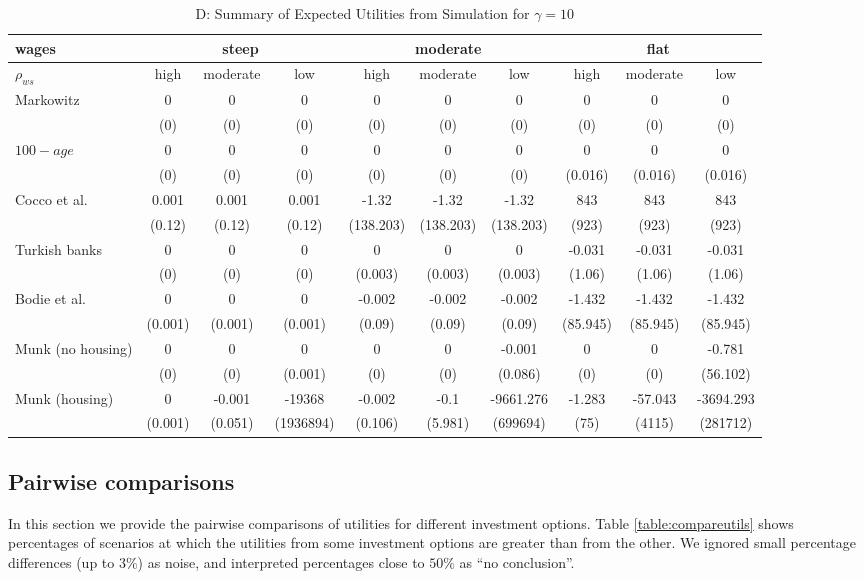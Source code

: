 \documentclass[]{elsarticle}
\begin{document}
\begin{table}[h!]\ContinuedFloat
	\centering
	\caption{D: Summary of Expected Utilities from Simulation for $\gamma=10$}
	\label{table:util}
	\begin{tabular}[c]{|l|ccc|ccc|ccc|}
		\hline
		 wages& \multicolumn{3}{c|}{steep} & \multicolumn{3}{c|}{moderate} & \multicolumn{3}{c|}{flat}\\
		\hline
		$\rho_{ws}$&high&moderate&low&high&moderate&low&high&moderate&low\\
		\hline
Markowitz					&0&0&0&0&0&0&0&0&0\\
							&(0)&(0)&(0)&(0)&(0)&(0)&(0)&(0)&(0)\\
$100-age$					&0&0&0&0&0&0&0&0&0\\
							&(0)&(0)&(0)&(0)&(0)&(0)&(0.016)&(0.016)&(0.016)\\
Cocco et al.				&0.001&0.001&0.001&-1.32&-1.32&-1.32&843&843&843\\
							&(0.12)&(0.12)&(0.12)&(138.203)&(138.203)&(138.203)&(923)&(923)&(923)\\
Turkish banks			 	&0&0&0&0&0&0&-0.031&-0.031&-0.031\\
							&(0)&(0)&(0)&(0.003)&(0.003)&(0.003)&(1.06)&(1.06)&(1.06)\\
Bodie et al.			 	&0&0&0&-0.002&-0.002&-0.002&-1.432&-1.432&-1.432\\
							&(0.001)&(0.001)&(0.001)&(0.09)&(0.09)&(0.09)&(85.945)&(85.945)&(85.945)\\
Munk (no housing)			&0&0&0&0&0&-0.001&0&0&-0.781\\
							&(0)&(0)&(0.001)&(0)&(0)&(0.086)&(0)&(0)&(56.102)\\
Munk (housing)				&0&-0.001&-19368&-0.002&-0.1&-9661.276&-1.283&-57.043&-3694.293\\
							&(0.001)&(0.051)&(1936894)&(0.106)&(5.981)&(699694)&(75)&(4115)&(281712)\\
	\hline
	\end{tabular}
\end{table}
\restoregeometry

\subsection{Pairwise comparisons}
In this section we provide the pairwise comparisons of utilities for different investment options. Table \ref{table:compareutils} shows percentages of scenarios at which the utilities from some investment options are greater than from the other. We ignored small percentage differences (up to $3\%$) as noise, and interpreted percentages close to $50\%$ as ``no conclusion''.
\end{document}
